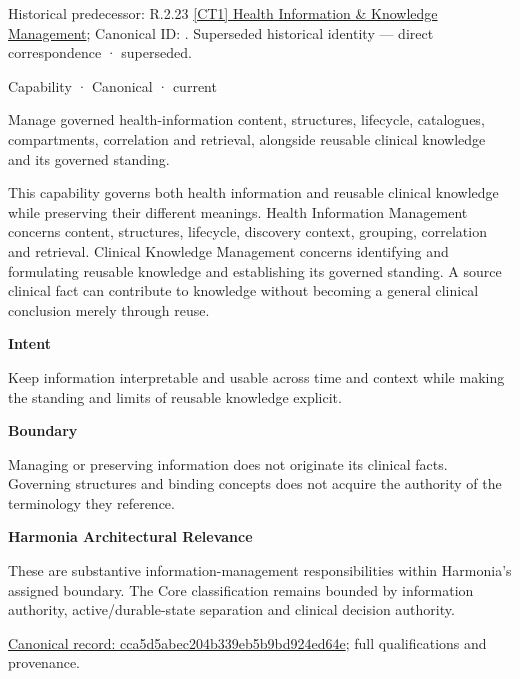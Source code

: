 {\small Historical predecessor: R.2.23 \hyperref[element:a1c557bd263047d0b3ff566cf50b98c1]{[CT1] Health Information \& Knowledge Management}; Canonical ID: \texttt{}. Superseded historical identity — direct correspondence · superseded.}\par
\label{element:cca5d5abec204b339eb5b9bd924ed64e}
{\small Capability · Canonical · current}\par

Manage governed health-information content, structures, lifecycle, catalogues, compartments, correlation and retrieval, alongside reusable clinical knowledge and its governed standing.



This capability governs both health information and reusable clinical knowledge while preserving their different meanings. Health Information Management concerns content, structures, lifecycle, discovery context, grouping, correlation and retrieval. Clinical Knowledge Management concerns identifying and formulating reusable knowledge and establishing its governed standing. A source clinical fact can contribute to knowledge without becoming a general clinical conclusion merely through reuse.



\textbf{Intent}



Keep information interpretable and usable across time and context while making the standing and limits of reusable knowledge explicit.



\textbf{Boundary}



Managing or preserving information does not originate its clinical facts. Governing structures and binding concepts does not acquire the authority of the terminology they reference.



\textbf{Harmonia Architectural Relevance}



These are substantive information-management responsibilities within Harmonia's assigned boundary. The Core classification remains bounded by information authority, active/durable-state separation and clinical decision authority.


{\footnotesize \href{../../../../continuum/strategy/capability/cca5d5abec204b339eb5b9bd924ed64e.md}{Canonical record: cca5d5abec204b339eb5b9bd924ed64e}; full qualifications and provenance.}\par
